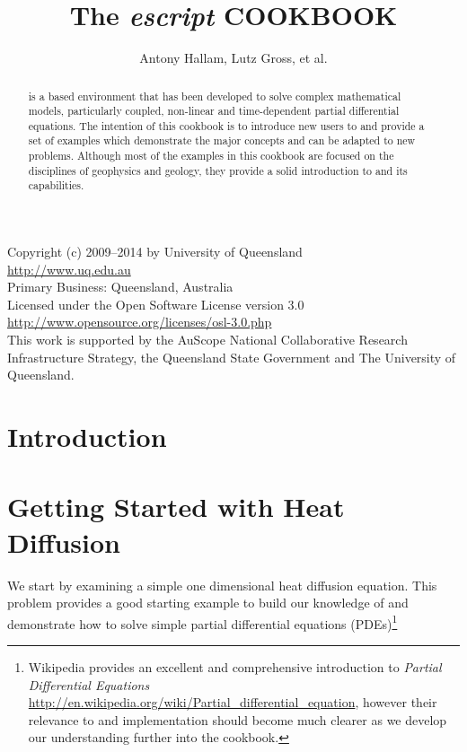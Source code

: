 \documentclass{esysdoc}
\title{The \textit{escript} COOKBOOK}
\author{Antony Hallam, Lutz Gross, et al.}
\date{\reldate}
\begin{document}
\maketitle

\ifpdf
{}
\fi

\begin{center}
Copyright (c) 2009--2014 by University of Queensland	\\
\url{http://www.uq.edu.au}				\\
Primary Business: Queensland, Australia			\\
Licensed under the Open Software License version 3.0	\\
\url{http://www.opensource.org/licenses/osl-3.0.php}	\\

This work is supported by the AuScope National Collaborative Research Infrastructure Strategy, 
the Queensland State Government and The University of Queensland.

\end{center}



\begin{abstract}
\esc is a \pyt based environment that has been developed to solve complex mathematical models, particularly coupled, non-linear and time-dependent partial differential equations. The intention of this cookbook is to introduce new users to \esc and provide a set of examples which demonstrate the major concepts and can be adapted to new problems. Although most of the examples in this cookbook are focused on the disciplines of geophysics and geology, they provide a solid introduction to \esc and its capabilities.
\end{abstract}


\cleardoublepage{}%
\tableofcontents

\newpage

\chapter{Introduction}
 \label{CHAP INTRO}
 
\chapter{Getting Started with Heat Diffusion}
 \label{CHAP HEAT DIFF}
 We start by examining a simple one dimensional heat diffusion equation. This
 problem provides a good starting example to build our knowledge of \esc and
 demonstrate how to solve simple partial differential equations
 (PDEs)\footnote{Wikipedia provides an excellent and comprehensive
 introduction to \textit{Partial Differential Equations}
 \url{http://en.wikipedia.org/wiki/Partial_differential_equation}, however
 their relevance to \esc and implementation should become much clearer as we
 develop our understanding further into the cookbook.}
 
 
\end{document}
